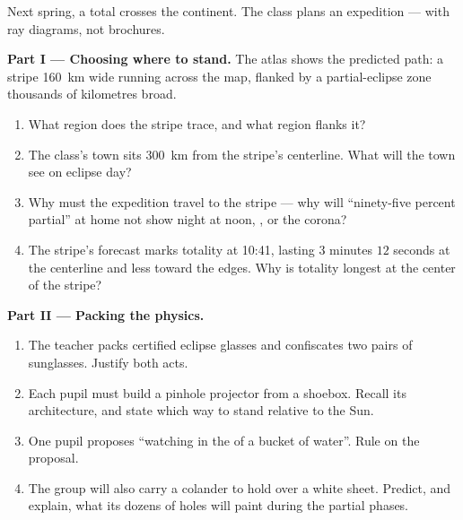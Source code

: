 \begin{problem}\label{pb:g7:shadows-eclipses:1}
Next spring, a total  crosses the continent. The
class plans an expedition --- with ray diagrams, not brochures.

\medskip\noindent\textbf{Part I --- Choosing where to stand.}
The atlas shows the predicted path: a stripe \qty{160}{km} wide
running across the map, flanked by a partial-eclipse zone
thousands of kilometres broad.
\begin{enumerate}
  \item What  region does the stripe trace, and what
        region flanks it?
  \item The class's town sits \qty{300}{km} from the stripe's
        centerline. What will the town see on eclipse day?
  \item Why must the expedition travel to the stripe --- why
        will ``ninety-five percent partial'' at home not show
        night at noon, , or the corona?
  \item The stripe's forecast marks totality at 10:41, lasting
        $3$ minutes $12$ seconds at the centerline and less
        toward the edges. Why is totality longest at the
        center of the stripe?
\end{enumerate}

\medskip\noindent\textbf{Part II --- Packing the physics.}
\begin{enumerate}[resume]
  \item The teacher packs certified eclipse glasses and confiscates
        two pairs of sunglasses. Justify both acts.
  \item Each pupil must build a pinhole projector from a
        shoebox. Recall its architecture, and state which way
        to stand relative to the Sun.
  \item One pupil proposes ``watching in the  of a
        bucket of water''. Rule on the proposal.
  \item The group will also carry a colander to hold over a
        white sheet. Predict, and explain, what its dozens of
        holes will paint during the partial phases.
\end{enumerate}


\end{problem}
